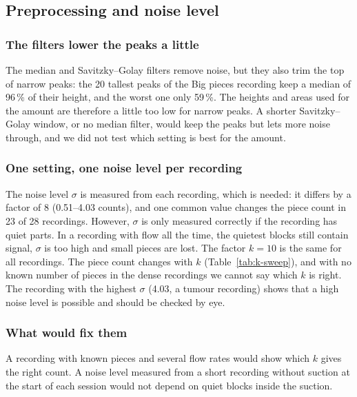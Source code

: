 \subsection{Preprocessing and noise level}
\label{sec:partA-discussion}
\subsubsection{The filters lower the peaks a little}
The median and Savitzky--Golay filters remove noise, but they also trim the top of narrow
peaks: the 20 tallest peaks of the Big pieces recording keep a median of 96\,\% of their height,
and the worst one only 59\,\%. The heights and areas used for the amount are therefore a little
too low for narrow peaks. A shorter Savitzky--Golay window, or no median filter, would keep the
peaks but lets more noise through, and we did not test which setting is best for the amount.

\subsubsection{One setting, one noise level per recording}
The noise level $\sigma$ is measured from each recording, which is needed: it differs by a factor
of 8 (0.51--4.03 counts), and one common value changes the piece count in 23 of 28 recordings.
However, $\sigma$ is only measured correctly if the recording has quiet parts. In a
recording with flow all the time, the quietest blocks still contain signal, $\sigma$ is too high
and small pieces are lost. The factor $k = 10$ is the same for all recordings. The piece count
changes with $k$ (Table~\ref{tab:k-sweep}), and with no known number of pieces in the dense
recordings we cannot say which $k$ is right. The recording with the highest $\sigma$ (4.03, a
tumour recording) shows that a high noise level is possible and should be checked by eye.

\subsubsection{What would fix them}
A recording with known pieces and several flow rates would show which $k$ gives the right count.
A noise level measured from a short recording without suction at the start of each session would
not depend on quiet blocks inside the suction.
